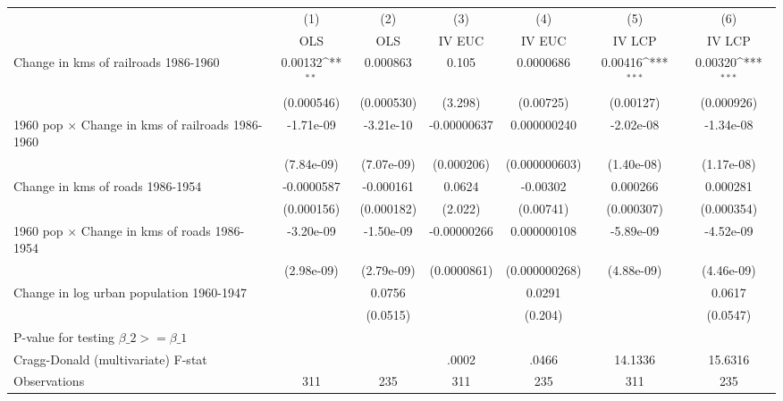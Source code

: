 {
\def\sym#1{\ifmmode^{#1}\else\(^{#1}\)\fi}
\begin{tabular}{l*{6}{c}}
\hline\hline
                &\multicolumn{1}{c}{(1)}&\multicolumn{1}{c}{(2)}&\multicolumn{1}{c}{(3)}&\multicolumn{1}{c}{(4)}&\multicolumn{1}{c}{(5)}&\multicolumn{1}{c}{(6)}\\
                &\multicolumn{1}{c}{OLS}&\multicolumn{1}{c}{OLS}&\multicolumn{1}{c}{IV EUC}&\multicolumn{1}{c}{IV EUC}&\multicolumn{1}{c}{IV LCP}&\multicolumn{1}{c}{IV LCP}\\
\hline
Change in kms of railroads 1986-1960&  0.00132\sym{**} & 0.000863         &    0.105         &0.0000686         &  0.00416\sym{***}&  0.00320\sym{***}\\
                &(0.000546)         &(0.000530)         &  (3.298)         &(0.00725)         &(0.00127)         &(0.000926)         \\
[1em]
1960 pop $\times$ Change in kms of railroads 1986-1960&-1.71e-09         &-3.21e-10         &-0.00000637         &0.000000240         &-2.02e-08         &-1.34e-08         \\
                &(7.84e-09)         &(7.07e-09)         &(0.000206)         &(0.000000603)         &(1.40e-08)         &(1.17e-08)         \\
[1em]
Change in kms of roads 1986-1954&-0.0000587         &-0.000161         &   0.0624         & -0.00302         & 0.000266         & 0.000281         \\
                &(0.000156)         &(0.000182)         &  (2.022)         &(0.00741)         &(0.000307)         &(0.000354)         \\
[1em]
1960 pop $\times$ Change in kms of roads 1986-1954&-3.20e-09         &-1.50e-09         &-0.00000266         &0.000000108         &-5.89e-09         &-4.52e-09         \\
                &(2.98e-09)         &(2.79e-09)         &(0.0000861)         &(0.000000268)         &(4.88e-09)         &(4.46e-09)         \\
[1em]
Change in log urban population 1960-1947&                  &   0.0756         &                  &   0.0291         &                  &   0.0617         \\
                &                  & (0.0515)         &                  &  (0.204)         &                  & (0.0547)         \\
\hline
P-value for testing $\beta\_{2} >= \beta\_{1}$&                  &                  &                  &                  &                  &                  \\
Cragg-Donald (multivariate) F-stat&                  &                  &    .0002         &    .0466         &  14.1336         &  15.6316         \\
Observations    &      311         &      235         &      311         &      235         &      311         &      235         \\
\hline\hline
\end{tabular}
}

